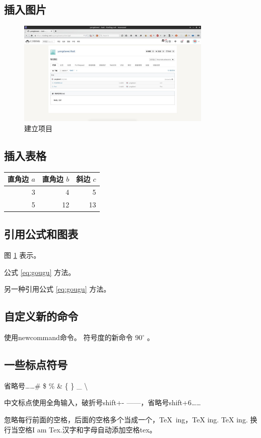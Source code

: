 \documentclass{hitec}
\newcommand\degree{^\circ}
\begin{document}
\subsection{插入图片}
\begin{figure}[H]
\centering
\includegraphics[height=5cm]{testcode.jpg}
\caption{建立项目}
\label{fig:createproject}
\end{figure}

\subsection{插入表格}
\begin{table}[H] %
\begin{tabular}{|rrr|}
\hline
直角边 $a$ & 直角边 $b$ & 斜边 $c$ \\
\hline
3 & 4 & 5 \\  %
5 & 12 & 13 \\ %
\hline
\end{tabular}
\end{table}

\subsection{引用公式和图表}
图 \ref{fig:createproject} 表示。

公式 \ref{eq:gougu} 方法。

另一种引用公式 \eqref{eq:gougu} 方法。 %

\subsection{自定义新的命令}
使用newcommand命令。
符号度的新命令 $90\degree$ 。%

\subsection{一些标点符号}
省略号\ldots \dots \# \quad \$ \quad \% \quad \& \quad \{ \quad \} \quad \_ \quad \textbackslash

中文标点使用全角输入，破折号shift+- ——，省略号shift+6……

忽略每行前面的空格，后面的空格多个当成一个，\TeX\ ing，\TeX{} ing. {\TeX} ing. 换行当空格I 
am Tex.汉字和字母自动添加空格tex。
\end{document}
